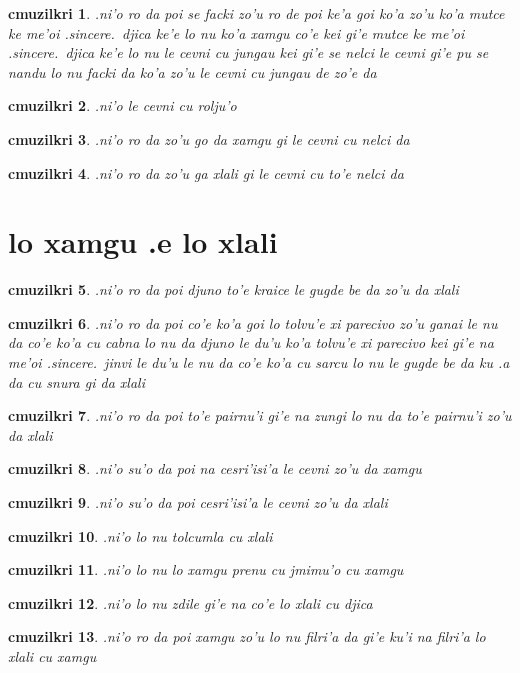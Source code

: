\documentclass{report}
\newtheorem{cmuzilkri}{cmuzilkri}
\begin{document}
\begin{cmuzilkri}
        .ni'o ro da poi se facki zo'u ro de poi ke'a goi ko'a zo'u ko'a mutce ke me'oi .sincere.\ djica ke'e lo nu ko'a xamgu co'e kei gi'e mutce ke me'oi .sincere.\ djica ke'e lo nu le cevni cu jungau kei gi'e se nelci le cevni gi'e pu se nandu lo nu facki da ko'a zo'u le cevni cu jungau de zo'e da
\end{cmuzilkri}
\begin{cmuzilkri}
	.ni'o le cevni cu rolju'o
\end{cmuzilkri}
\begin{cmuzilkri}
        .ni'o ro da zo'u go da xamgu gi le cevni cu nelci da
\end{cmuzilkri}
\begin{cmuzilkri}
        .ni'o ro da zo'u ga xlali gi le cevni cu to'e nelci da
\end{cmuzilkri}

\section{lo xamgu .e lo xlali}
\begin{cmuzilkri}
	.ni'o ro da poi djuno to'e kraice le gugde be da zo'u da xlali
\end{cmuzilkri}
\begin{cmuzilkri}
        .ni'o ro da poi co'e ko'a goi lo tolvu'e xi parecivo zo'u ganai le nu da co'e ko'a cu cabna lo nu da djuno le du'u ko'a tolvu'e xi parecivo kei gi'e na me'oi .sincere.\ jinvi le du'u le nu da co'e ko'a cu sarcu lo nu le gugde be da ku .a da cu snura gi da xlali
\end{cmuzilkri}
\begin{cmuzilkri}
	.ni'o ro da poi to'e pairnu'i gi'e na zungi lo nu da to'e pairnu'i zo'u da xlali
\end{cmuzilkri}
\begin{cmuzilkri}
        .ni'o su'o da poi na cesri'isi'a le cevni zo'u da xamgu
\end{cmuzilkri}
\begin{cmuzilkri}
        .ni'o su'o da poi cesri'isi'a le cevni zo'u da xlali
\end{cmuzilkri}
\begin{cmuzilkri}
        .ni'o lo nu tolcumla cu xlali
\end{cmuzilkri}
\begin{cmuzilkri}
	.ni'o lo nu lo xamgu prenu cu jmimu'o cu xamgu
\end{cmuzilkri}
\begin{cmuzilkri}
        .ni'o lo nu zdile gi'e na co'e lo xlali cu djica
\end{cmuzilkri}
\begin{cmuzilkri}
        .ni'o ro da poi xamgu zo'u lo nu filri'a da gi'e ku'i na filri'a lo xlali cu xamgu
\end{cmuzilkri}
\end{document}
